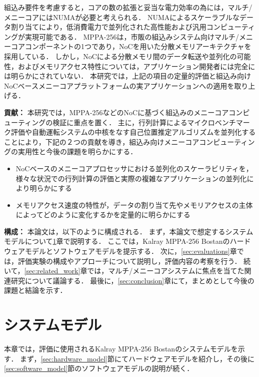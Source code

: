 \documentclass[submit,techrep]{ipsj_v2/UTF8/ipsj}
\begin{document}
組込み要件を考慮すると，コアの数の拡張と妥当な電力効率の為には，マルチ/メニーコアにはNUMAが必要と考えられる．
NUMAによるスケーラブルなデータ割り当てにより，低消費電力で並列化された高性能および汎用コンピューティングが実現可能である．
MPPA-256は，市販の組込みシステム向けマルチ/メニーコアコンポーネントの1つであり，NoCを用いた分散メモリアーキテクチャを採用している． 
しかし，NoCによる分散メモリ間のデータ転送や並列化の可能性，およびメモリアクセス特性については，アプリケーション開発者には完全には明らかにされていない．
本研究では，上記の項目の定量的評価と組込み向けNoCベースメニーコアプラットフォームの実アプリケーションへの適用を取り上げる．

\textbf{貢献：}
本研究では，MPPA-256などのNoCに基づく組込みのメニーコアコンピューティングの検証に重点を置く．
主に，行列計算によるマイクロベンチマーク評価や自動運転システムの中核をなす自己位置推定アルゴリズムを並列化することにより，下記の２つの貢献を導き，組込み向けメニーコアコンピューティングの実用性と今後の課題を明らかにする．

\begin{itemize}
\item NoCベースのメニーコアプロセッサにおける並列化のスケーラビリティを，様々な状況での行列計算の評価と実際の複雑なアプリケーションの並列化により明らかにする
\item メモリアクセス速度の特性が，データの割り当て先やメモリアクセスの主体によってどのように変化するかを定量的に明らかにする
\end{itemize}


\textbf{構成：}
本論文は，以下のように構成される．
まず，本論文で想定するシステムモデルについて\ref{sec:system_model}章で説明する．
ここでは，Kalray MPPA-256 Bostanのハードウェアモデルとソフトウェアモデルを提示する．
次に，\ref{sec:evaluations}章では，評価実験の構成やアプローチについて説明し，評価内容の考察を行う．
続いて，\ref{sec:related_work}章では，マルチ/メニーコアシステムに焦点を当てた関連研究について議論する．
最後に，\ref{sec:conclusion}章にて，まとめとして今後の課題と結論を示す．

\section{システムモデル}
\label{sec:system_model}
本章では，評価に使用されるKalray MPPA-256 Bostanのシステムモデルを示す．
まず，\ref{sec:hardware_model}節にてハードウェアモデルを紹介し，その後に\ref{sec:software_model}節のソフトウェアモデルの説明が続く．
\end{document}
